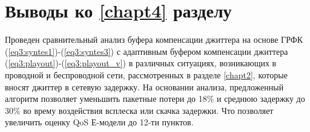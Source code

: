 \section{Выводы ко \ref{chapt4} разделу} \label{sect:concl4}
Проведен сравнительный анализ буфера компенсации джиттера на основе ГРФК (\ref{eq3:syntes1})-(\ref{eq3:syntes3})
с адаптивным буфером компенсации джиттера (\ref{eq3:playout})-(\ref{eq3:playout_v}) в различных ситуациях, возникающих в проводной и беспроводной сети, рассмотренных в разделе \ref{chapt2}, которые вносят джиттер в сетевую задержку.
На основании анализа, предложенный алгоритм позволяет уменьшить пакетные потери до 18\% и среднюю задержку до 30\% во врему воздействия всплеска или скачка задержки.
Что позволяет увеличить оценку QoS Е-модели до 12-ти пунктов.